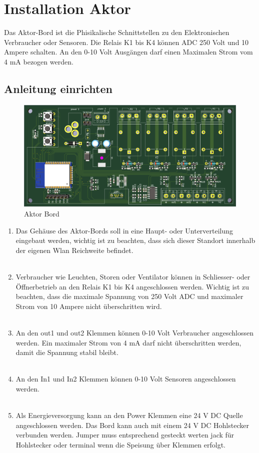 \clearpage
\section{Installation Aktor}\label{sec:Aktor}
Das Aktor-Bord ist die Phisikalische Schnittstellen zu den Elektronischen Verbraucher oder Sensoren. Die Relais K1 bis K4 können ADC 250 Volt und 10 Ampere schalten. An den 0-10 Volt Ausgängen darf einen Maximalen Strom vom 4 mA bezogen werden.
\subsection{Anleitung einrichten}
\begin{figure}[H]
	\centering
	\includegraphics[width=\textwidth]{graphics/Aktorbaustein.png}
	\caption{Aktor Bord} 	
	\label{pic: OSGILayers}
\end{figure} 

\begin{enumerate}
	\item Das Gehäuse des Aktor-Bords soll in eine Haupt- oder Unterverteilung eingebaut werden, wichtig ist zu beachten, dass sich dieser Standort innerhalb der eigenen Wlan Reichweite befindet.\\
	\\
	\item Verbraucher wie Leuchten, Storen oder Ventilator können in Schliesser- oder Öffnerbetrieb an den Relais K1 bis K4 angeschlossen werden. Wichtig ist zu beachten, dass die maximale Spannung von 250 Volt ADC und maximaler Strom von 10 Ampere nicht überschritten wird.\\
		\\
	\item An den out1 und out2 Klemmen können 0-10 Volt Verbraucher angeschlossen werden. Ein maximaler Strom von 4 mA darf nicht überschritten werden, damit die Spannung stabil bleibt.\\
	\\
	\item An den In1 und In2 Klemmen können 0-10 Volt Sensoren angeschlossen werden.\\
	\\
	\item Als Energieversorgung kann an den Power Klemmen eine 24 V DC Quelle angeschlossen werden. Das Bord kann auch mit einem 24 V DC Hohlstecker verbunden werden. Jumper muss entsprechend gesteckt werten jack für Hohlstecker oder terminal wenn die Speisung über Klemmen erfolgt. 
\end{enumerate}

